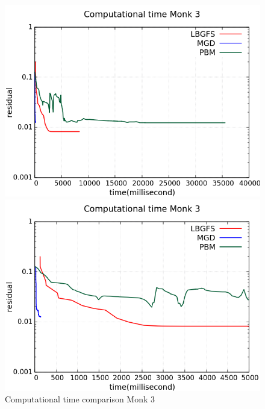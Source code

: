 \begin{figure}[H]
	\centering
	\begin{minipage}[t]{0.5\linewidth}
		\includegraphics[width=\linewidth]{data/Comparison/Monk3/Monk3_CT_Comparison_log_standard.png}
	\end{minipage}%
	\begin{minipage}[t]{0.5\linewidth}
		\includegraphics[width=\linewidth]{data/Comparison/Monk3/Monk3_CT_Comparison_log_zoom.png}
	\end{minipage}
	\caption{Computational time comparison Monk 3}
	\label{CT-Monk3}
\end{figure}



